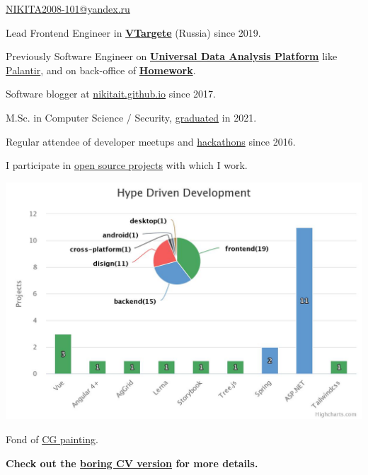 \documentclass{yb}
\begin{document}
\ybPrintPhoto{}

{\scshape\bfseries\Large {}}\newline
\href{mailto:NIKITA2008-101@yandex.ru}{NIKITA2008-101@yandex.ru}

\vspace*{1em}

Lead Frontend Engineer in \href{https://vtargete.ru/}{\textbf{VTargete}} (Russia) \newline
since 2019.

\vspace*{1em}

Previously Software Engineer on \textbf{\href{https://baltinfocom.ru/BigData\#en}{Universal Data Analysis Platform}} like \href{https://www.palantir.com/}{Palantir}, and on back-office of \textbf{\href{https://homework.ru}{Homework}}.

Software blogger at \href{https://nikitait.github.io/}{nikitait.github.io} since 2017.

M.Sc. in Computer Science / Security, \href{https://etu.ru/en/university/}{graduated} in 2021.

Regular attendee of developer meetups and \href{https://www.youtube.com/watch?v=gVKDU043EWI&t=1s&ab_channel=EPAMSaint-Petersburg}{hackathons} since 2016.

I participate in \href{https://github.com/nikitait}{open source projects} with which I work.

\includegraphics[width=\textwidth]{./hype-driven-development.jpeg}

Fond of \href{https://www.artstation.com/nikitait}{CG painting}.

\textbf{Check out the \href{https://texlive2020.latexonline.cc/compile?git=https://github.com/NikitaIT/cv&target=resume-boring.tex&command=pdflatex}{boring CV version} for more details.}
\end{document}
